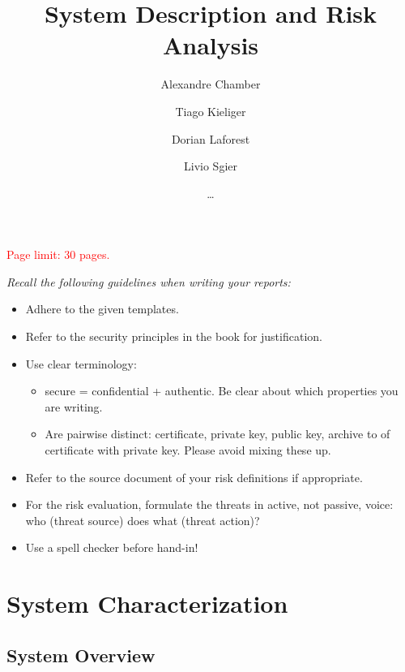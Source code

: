 \documentclass[english]{article}
\title{\huge\sffamily\bfseries System Description and Risk Analysis}
\author{Alexandre Chamber \and Tiago Kieliger \and Dorian Laforest \and Livio Sgier}
\date{\dots}
\begin{document}
\maketitle

\begin{center}
{\large\textcolor{red}{Page limit: 30 pages.}}
\end{center}

\tableofcontents
\pagebreak

\begin{framed}
\noindent
{\it
Recall the following guidelines when writing your reports:
\begin{itemize}
\item Adhere to the given templates.

\item Refer to the security principles in the book for justification.

\item Use clear terminology: 
\begin{itemize}
\item secure = confidential + authentic. Be clear about
which properties you are writing.
\item Are pairwise distinct: certificate, private key, public key, archive to of certificate with private key. Please avoid mixing these up.
\end{itemize}

\item Refer to the source document of your risk definitions if appropriate.

\item For the risk evaluation, formulate the threats in active, not passive, 
voice: who (threat source) does what (threat action)? 

\item Use a spell checker before hand-in!

\end{itemize}
}
\end{framed}


\section{System Characterization}

\subsection{System Overview}\label{ssec:system_overview}
\end{document}
